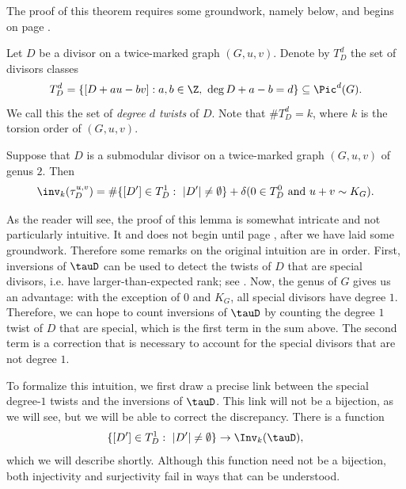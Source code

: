 The proof of this theorem requires some groundwork, namely  below, and begins on page \pageref{proof:kgtThetas}.

\begin{defi}
Let $D$ be a divisor on a twice-marked graph $(G,u,v)$. Denote by $T^d_D$ the set of divisors classes
$$T^d_{D} = \left\{ [D + a u - bv]: a,b \in \Z,\ \deg D + a - b = d \right\} \subseteq \Pic^d(G).$$
We call this the set of \emph{degree $d$ twists} of $D$. Note that $\#T^d_D = k$, where $k$ is the torsion order of $(G,u,v)$.
\end{defi}

\begin{lemma}
\label{lem:invtau}
Suppose that $D$ is a submodular divisor on a twice-marked graph $(G,u,v)$ of genus $2$. Then
$$\inv_k (\tau_D^{u,v}) = 
\# \{ [D'] \in T^1_D:\ |D'| \neq \emptyset \} + \delta( 0 \in T^0_D \mbox{ and } u+v \sim K_G).$$
\end{lemma}

As the reader will see, the proof of this lemma is somewhat intricate and not particularly intuitive. It and does not begin until page \pageref{proof:invtau}, after we have laid some groundwork. Therefore some remarks on the original intuition are in order. First, inversions of $\tauD$ can be used to detect the twists of $D$ that are special divisors, i.e. have larger-than-expected rank; see . Now, the genus of $G$ gives us an advantage: with the exception of $0$ and $K_G$, all special divisors have degree $1$. Therefore, we can hope to count inversions of $\tauD$ by counting the degree $1$ twist of $D$ that are special, which is the first term in the sum above. The second term is a correction that is necessary to account for the special divisors that are not degree $1$.

To formalize this intuition, we first draw a precise link between the special degree-$1$ twists and the inversions of $\tauD$. This link will not be a bijection, as we will see, but we will be able to correct the discrepancy. 
There is a function
$$\{ [D'] \in T^1_D:\ |D'| \neq \emptyset \} \to \Inv_k(\tauD),$$
which we will describe shortly. Although this function need not be a bijection, both injectivity and surjectivity fail in ways that can be understood.

